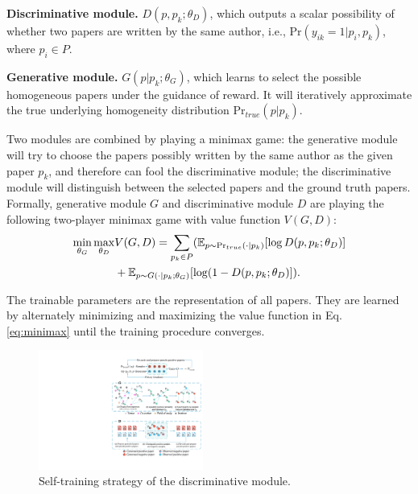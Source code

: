 \documentclass[letterpaper]{article} %
\begin{document}
\vspace*{1pt}
\textbf{Discriminative module.} $D(p, p_k; \theta_D)$, which outputs a scalar possibility of whether two papers are written by the same author, i.e., $\text{Pr}(y_{ik}=1|p_i,p_k)$, where $p_i \in P$.

\vspace*{2pt}
\textbf{Generative module.} $G(p|p_k; \theta_G)$, which learns to select the possible homogeneous papers under the guidance of reward. It will iteratively approximate the true underlying homogeneity distribution $\text{Pr}_{true}(p|p_k)$.

Two modules are combined by playing a minimax game: 
the generative module will try to choose the papers possibly written by the same author as the given paper $p_k$, and therefore can fool the discriminative module; 
the discriminative module will distinguish between the selected papers and the ground truth papers.
Formally, generative module $G$ and discriminative module $D$ are playing the following two-player minimax game with value function $V(G, D)$:
\begin{equation}
\begin{split}
\small
\min_{\theta_G}  \max_{\theta_D} & V(G, D) = \sum_{p_k \in P} (\mathbb{E}_{p \sim \text{Pr}_{true}(\cdot|p_k)}[\log D(p, p_k; \theta_D)] \\
&+ \mathbb{E}_{p \sim G(\cdot|p_k;\theta_G)} [\log(1-D(p, p_k; \theta_D)]).
\label{eq:minimax}
\end{split}
\end{equation}

The trainable parameters are the representation of all papers. They are learned by alternately minimizing and maximizing the value function in Eq.~ \eqref{eq:minimax} until the training procedure converges. 
\begin{figure}[t]
\centering
\includegraphics[width=0.48\textwidth]{D.pdf}
\caption{Self-training strategy of the discriminative module.}
\label{fig:D_framework}
\end{figure}
\end{document}
